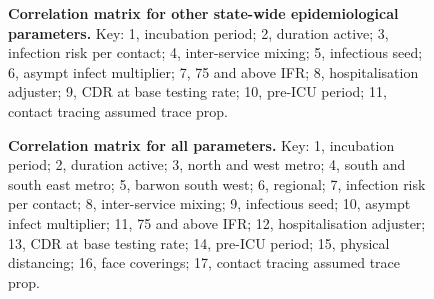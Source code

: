 \begin{figure}[ht]
    \caption{\textbf{Correlation matrix for other state-wide epidemiological parameters.} Key: 1, incubation period; 2, duration active; 3, infection risk per contact; 4, inter-service mixing; 5, infectious seed; 6, asympt infect multiplier; 7, 75 and above IFR; 8, hospitalisation adjuster; 9, CDR at base testing rate; 10, pre-ICU period; 11, contact tracing assumed trace prop.}
\end{figure}

\begin{figure}[ht]
    \caption{\textbf{Correlation matrix for all parameters.} Key: 1, incubation period; 2, duration active; 3, north and west metro; 4, south and south east metro; 5, barwon south west; 6, regional; 7, infection risk per contact; 8, inter-service mixing; 9, infectious seed; 10, asympt infect multiplier; 11, 75 and above IFR; 12, hospitalisation adjuster; 13, CDR at base testing rate; 14, pre-ICU period; 15, physical distancing; 16, face coverings; 17, contact tracing assumed trace prop.}
\end{figure}

